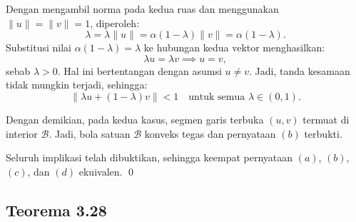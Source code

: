 \documentclass[aspectratio=169,11pt]{beamer}
\theoremstyle{definition}
\begin{document}
\begin{frame}[allowframebreaks]{\insertsection}{\insertsubsection}
\begin{itemize}
\begin{enumerate}
                  Dengan mengambil norma pada kedua ruas dan menggunakan $\|u\| = \|v\| = 1$, diperoleh:
                  \begin{equation*}
                    \lambda = \lambda\|u\| = \alpha(1-\lambda)\|v\|
                    = \alpha(1-\lambda).
                  \end{equation*}
                  Substitusi nilai $\alpha(1-\lambda)=\lambda$ ke hubungan kedua vektor menghasilkan:
                  \begin{equation*}
                    \lambda u = \lambda v \implies u=v,
                  \end{equation*}
                  sebab $\lambda > 0$. Hal ini bertentangan dengan asumsi $u \neq v$. Jadi, tanda kesamaan tidak mungkin terjadi, sehingga:
                  \begin{equation*}
                    \|\lambda u + (1-\lambda)v\| < 1 \quad \text{untuk semua } \lambda \in (0,1).
                  \end{equation*}
          \end{enumerate}
          Dengan demikian, pada kedua kasus, segmen garis terbuka $(u,v)$ termuat di interior $\mathcal{B}$. Jadi, bola satuan $\mathcal{B}$ konveks tegas dan pernyataan $(b)$ terbukti.
  \end{itemize}

  Seluruh implikasi telah dibuktikan, sehingga keempat pernyataan $(a)$, $(b)$, $(c)$, dan $(d)$ ekuivalen. \qed
\end{frame}

\subsection{Teorema 3.28}
\end{document}
